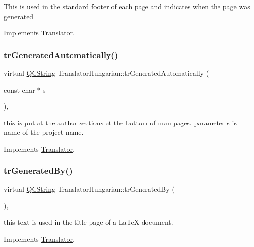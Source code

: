 This is used in the standard footer of each page and indicates when the page was generated 

Implements \mbox{\hyperlink{class_translator}{Translator}}.

\mbox{\label{class_translator_hungarian_a71914470d55f260a94c8c14d953b5185}} 
\subsubsection{\texorpdfstring{trGeneratedAutomatically()}{trGeneratedAutomatically()}}
{\footnotesize\ttfamily virtual \mbox{\hyperlink{class_q_c_string}{Q\+C\+String}} Translator\+Hungarian\+::tr\+Generated\+Automatically (\begin{DoxyParamCaption}\item[{const char $\ast$}]{s }\end{DoxyParamCaption})\hspace{0.3cm}{\ttfamily [inline]}, {\ttfamily [virtual]}}

this is put at the author sections at the bottom of man pages. parameter s is name of the project name. 

Implements \mbox{\hyperlink{class_translator}{Translator}}.

\mbox{\label{class_translator_hungarian_af52074a011203d68ba20222bb8a2bf3f}} 
\subsubsection{\texorpdfstring{trGeneratedBy()}{trGeneratedBy()}}
{\footnotesize\ttfamily virtual \mbox{\hyperlink{class_q_c_string}{Q\+C\+String}} Translator\+Hungarian\+::tr\+Generated\+By (\begin{DoxyParamCaption}{ }\end{DoxyParamCaption})\hspace{0.3cm}{\ttfamily [inline]}, {\ttfamily [virtual]}}

this text is used in the title page of a La\+TeX document. 

Implements \mbox{\hyperlink{class_translator}{Translator}}.

